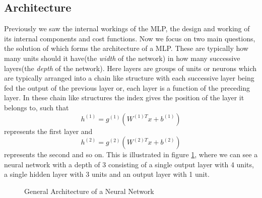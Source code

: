 \documentclass[14pt]{extarticle}
\numberwithin{equation}{section}
\begin{document}
	\subsection{Architecture}
	Previously we saw the internal workings of the MLP, the design and working of its internal components and cost functions. Now we focus on two main questions, the solution of which forms the architecture of a MLP. These are typically how many units should it have(the \textit{width} of the network) in how many successive layers(the \textit{depth} of the network). Here layers are groups of units or neurons which are typically arranged into a chain like structure with each successive layer being fed the output of the previous layer or, each layer is a function of the preceding layer. In these chain like structures the index gives the position of the layer it belongs to, such that $$h^{(1)} = g^{(1)}(W^{(1)T}x + b^{(1)})$$ represents the first layer and $$h^{(2)} = g^{(2)}(W^{(2)T}x + b^{(2)})$$ represents the second\cite{Goodfellow-et-al-2016} and so on. This is illustrated in figure \ref{nn_arch}, where we can see a neural network with a depth of 3 consisting of a single output layer with 4 units, a single hidden layer with 3 units and an output layer with 1 unit.
	\begin{figure}[H]
		\centering
		\setlength{\fboxsep}{5pt}%
		\setlength{\fboxrule}{1pt}%
		\caption{General Architecture of a Neural Network
			\label{nn_arch}}
	\end{figure}
\end{document}
